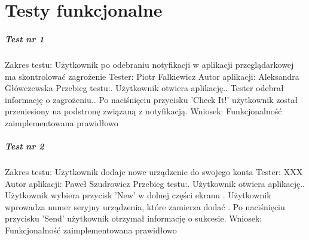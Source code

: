 \chapter{Testy funkcjonalne}

\paragraph{Test nr 1}
Zakres testu:\newline
Użytkownik po odebraniu notyfikacji w aplikacji przeglądarkowej ma skontrolować zagrożenie\newline
Tester: Piotr Falkiewicz\newline
Autor aplikacji: Aleksandra Główczewska\newline
Przebieg testu:. Użytkownik otwiera aplikację.. Tester odebrał informację o zagrożeniu.. Po naciśnięciu przycisku 'Check It!' użytkownik został przeniesiony na podstronę związaną z notyfikacją.\newline
Wniosek:\newline
Funkcjonalność zaimplementowana prawidłowo\newline
\newline

\paragraph{Test nr 2}
Zakres testu:\newline
Użytkownik dodaje nowe urządzenie do swojego konta\newline
Tester: XXX \newline
Autor aplikacji: Paweł Szudrowicz \newline
Przebieg testu:. Użytkownik otwiera aplikację.. Użytkownik wybiera przycisk 'New' w dolnej części ekranu . Użytkownik wprowadza numer seryjny urządzenia, które zamierza dodać . Po naciśnięciu przycisku 'Send' użytkownik otrzymał informację o sukcesie.\newline
Wniosek:\newline
Funkcjonalność zaimplementowana prawidłowo\newline
\newline
 
